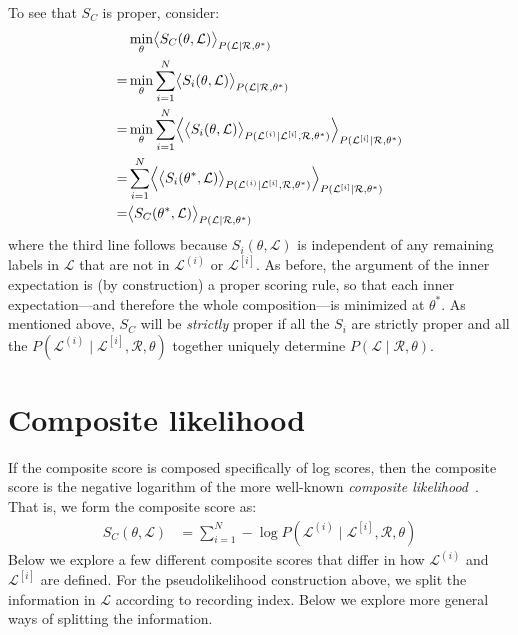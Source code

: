\documentclass[a4paper,oneside,12pt,english]{report}
\def\expv#1#2{\bigl\langle#1\bigr\rangle_{#2}}
\def\Expv#1#2{\Bigl\langle#1\Bigr\rangle_{#2}}
\def\Lset{\mathcal{L}}
\def\Rset{\mathcal{R}}
\begin{document}
To see that $S_C$ is proper, consider:
\begin{align}
\begin{split}
&\min_\theta \expv{S_C(\theta,\Lset)}{P(\Lset\mid\Rset,\theta^*)}\\
=&\min_\theta \sum_{i=1}^N \expv{S_i(\theta,\Lset)}{P(\Lset\mid\Rset,\theta^*)} \\
=&\min_\theta \sum_{i=1}^N \Expv{\expv{S_i(\theta,\Lset)}{P(\Lset^{(i)}\mid\Lset^{[i]},\Rset,\theta^*)}}{P(\Lset^{[i]}\mid\Rset,\theta^*)} \\
=&\sum_{i=1}^N \Expv{\expv{S_i(\theta^*,\Lset)}{P(\Lset^{(i)}\mid\Lset^{[i]},\Rset,\theta^*)}}{P(\Lset^{[i]}\mid\Rset,\theta^*)} \\
=& \expv{S_C(\theta^*,\Lset)}{P(\Lset\mid\Rset,\theta^*)}
\end{split}
\end{align}
where the third line follows because $S_i(\theta,\Lset)$ is independent of any remaining labels in $\Lset$ that are not in $\Lset^{(i)}$ or $\Lset^{[i]}$. As before, the argument of the inner expectation is (by construction) a proper scoring rule, so that each inner expectation---and therefore the whole composition---is minimized at $\theta^*$. As mentioned above, $S_C$ will be \emph{strictly} proper if all the $S_i$ are strictly proper and all the $P(\Lset^{(i)}\mid\Lset^{[i]},\Rset,\theta)$ together uniquely determine $P(\Lset\mid\Rset,\theta)$.


\section{Composite likelihood}
If the composite score is composed specifically of log scores, then the composite score is the negative logarithm of the more well-known \emph{composite likelihood}~\cite{Dawid_Musio_ThApp_PSR_2014,stats_sinica}. That is, we form the composite score as:
\begin{align}
\label{eq:df1}
S_C(\theta,\Lset) &= \sum_{i=1}^N -\log P(\Lset^{(i)}\mid\Lset^{[i]},\Rset,\theta) 
\end{align} 
Below we explore a few different composite scores that differ in how $\Lset^{(i)}$ and $\Lset^{[i]}$ are defined. For the pseudolikelihood construction above, we split the information in $\Lset$ according to recording index. Below we explore more general ways of splitting the information. 
\end{document}
